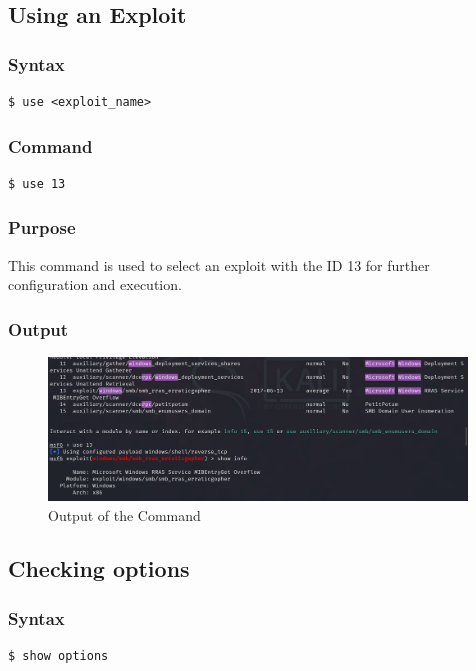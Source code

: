 \documentclass[11pt]{article}
\begin{document}
\subsection{Using an Exploit}

\subsubsection*{Syntax}
\begin{verbatim}
$ use <exploit_name>
\end{verbatim}

\subsubsection*{Command}
\begin{verbatim}
$ use 13
\end{verbatim}

\subsubsection*{Purpose}
This command is used to select an exploit with the ID 13 for further configuration and execution.
\subsubsection*{Output}
\begin{figure}[H]
    \centering
    \includegraphics[width=0.99\textwidth]{a3_ss (20).png}
    \caption{Output of the Command}
\end{figure}
\subsection{Checking options}

\subsubsection*{Syntax}
\begin{verbatim}
$ show options
\end{verbatim}
\end{document}
